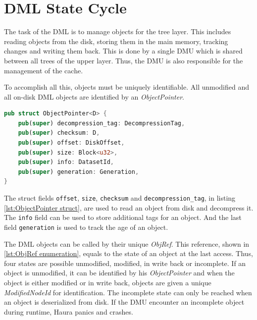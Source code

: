 \documentclass[
	12pt,
	a4paper,
	abstract,
	bibliography=totoc,
	chapterprefix,
	headings=openright,
	numbers=endperiod,
	parskip=half,
	twoside,
]{scrreprt}
\begin{document}
\section{DML State Cycle}
\label{sec:dml state cycle}

The task of the DML is to manage objects for the tree layer. This includes reading objects from the disk, storing them in the main memory, tracking changes and writing them back.
This is done by a single DMU which is shared between all trees of the upper layer.
Thus, the DMU is also responsible for the management of the cache.

To accomplish all this, objects must be uniquely identifiable.
All unmodified and all on-disk DML objects are identified by an \emph{ObjectPointer}.

\bigskip
{}

\begin{lstlisting}[language=Rust,mathescape=true,caption=ObjectPointer struct ,label=lst:ObjectPointer struct]
pub struct ObjectPointer<D> {
    pub(super) decompression_tag: DecompressionTag,
    pub(super) checksum: D,
    pub(super) offset: DiskOffset,
    pub(super) size: Block<u32>,
    pub(super) info: DatasetId,
    pub(super) generation: Generation,
}
\end{lstlisting}

The struct fields \texttt{offset}, \texttt{size}, \texttt{checksum} and \texttt{decompression\_tag}, in listing \ref{lst:ObjectPointer struct}, are used to read an object from disk and decompress it.
The \texttt{info} field can be used to store additional tags for an object.
And the last field \texttt{generation} is used to track the age of an object.

The DML objects can be called by their unique \emph{ObjRef}.
This reference, shown in \ref{lst:ObjRef enumeration}, equals to the state of an object at the last access.
Thus, four states are possible unmodified, modified, in write back or incomplete.
If an object is unmodified, it can be identified by his \emph{ObjectPointer} and
when the object is either modified or in write back, objects are given a unique \emph{ModifiedNodeId} for identification.
The incomplete state can only be reached when an object is deserialized from disk.
If the DMU encounter an incomplete object during runtime, Haura panics and crashes.

\bigskip
\end{document}
